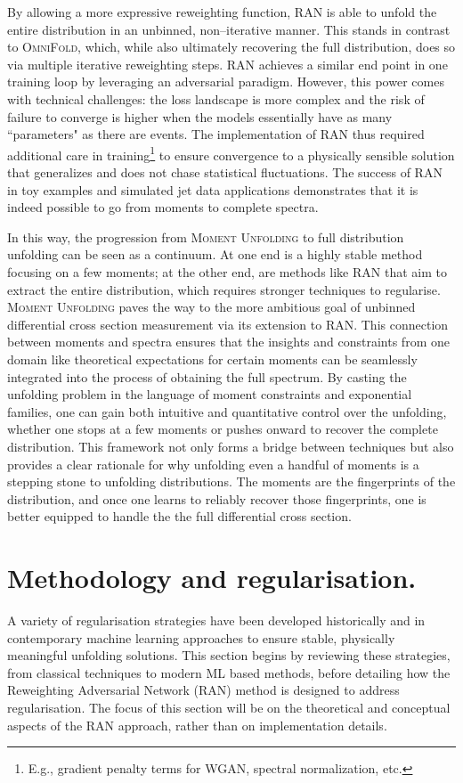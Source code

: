 {{        By allowing a more expressive reweighting function, RAN is able to unfold the entire distribution in an unbinned, non--iterative manner.
        This stands in contrast to \textsc{OmniFold}, which, while also ultimately recovering the full distribution, does so via multiple iterative reweighting steps.
        RAN achieves a similar end point in one training loop by leveraging an adversarial paradigm.
        However, this power comes with technical challenges: the loss landscape is more complex and the risk of failure to converge is higher when the models essentially have as many ``parameters" as there are events.
        The implementation of RAN thus required additional care in training\footnote{E.g., gradient penalty terms for WGAN, spectral normalization, etc.} to ensure convergence to a physically sensible solution that generalizes and does not chase statistical fluctuations.
        The success of RAN in toy examples and simulated jet data applications demonstrates that it is indeed possible to go from moments to complete spectra.

In this way, the progression from \textsc{Moment Unfolding} to full distribution unfolding can be seen as a continuum.
%
At one end is a highly stable method focusing on a few moments; at the other end, are methods like RAN that aim to extract the entire distribution, which requires stronger techniques to regularise.
%
\textsc{Moment Unfolding} paves the way to the more ambitious goal of unbinned differential cross section measurement via its extension to RAN.
%
This connection between moments and spectra ensures that the insights and constraints from one domain like theoretical expectations for certain moments can be seamlessly integrated into the process of obtaining the full spectrum.
%
By casting the unfolding problem in the language of moment constraints and exponential families, one can gain both intuitive and quantitative control over the unfolding, whether one stops at a few moments or pushes onward to recover the complete distribution.
%
This framework not only forms a bridge between techniques but also provides a clear rationale for why unfolding even a handful of moments is a stepping stone to unfolding distributions.
%
The moments are the fingerprints of the distribution, and once one learns to reliably recover those fingerprints, one is better equipped to handle the the full differential cross section.

\section{Methodology and regularisation.}
\label{sec:ran-methodology-and-regularisation}
    A variety of regularisation strategies have been developed historically and in contemporary machine learning approaches to ensure stable, physically meaningful unfolding solutions.
    This section begins by reviewing these strategies, from classical techniques to modern ML based methods, before detailing how the Reweighting Adversarial Network (RAN) method is designed to address regularisation.
    The focus of this section will be on the theoretical and conceptual aspects of the RAN approach, rather than on implementation details.

}}
